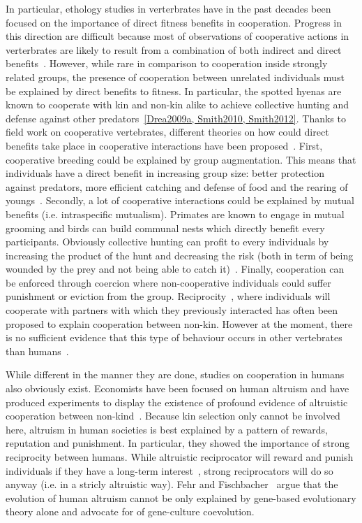     In particular, ethology studies in verterbrates have in the past decades been focused on the importance of direct fitness benefits in cooperation. Progress in this direction are difficult because most of observations of cooperative actions in verterbrates are likely to result from a combination of both indirect and direct benefits~\cite{Clutton-Brock2009}. However, while rare in comparison to cooperation inside strongly related groups, the presence of cooperation between unrelated individuals must be explained by direct benefits to fitness. In particular, the spotted hyenas are known to cooperate with kin and non-kin alike to achieve collective hunting and defense against other predators~\ref{Drea2009a, Smith2010, Smith2012}. Thanks to field work on cooperative vertebrates, different theories on how could direct benefits take place in cooperative interactions have been proposed~\cite{Clutton-Brock2002}. First, cooperative breeding could be explained by group augmentation. This means that individuals have a direct benefit in increasing group size: better protection against predators, more efficient catching and defense of food and the rearing of youngs~\cite{Packer2001}. Secondly, a lot of cooperative interactions could be explained by mutual benefits (i.e. intraspecific mutualism). Primates are known to engage in mutual grooming and birds can build communal nests which directly benefit every participants. Obviously collective hunting can profit to every individuals by increasing the product of the hunt and decreasing the risk (both in term of being wounded by the prey and not being able to catch it)~\cite{Scheel1991}. Finally, cooperation can be enforced through coercion where non-cooperative individuals could suffer punishment or eviction from the group. Reciprocity~\cite{Trivers1971}, where individuals will cooperate with partners with which they previously interacted has often been proposed to explain cooperation between non-kin. However at the moment, there is no sufficient evidence that this type of behaviour occurs in other vertebrates than humans~\cite{Hammerstein2003, Clutton-Brock2009, André2014}.


    While different in the manner they are done, studies on cooperation in humans also obviously exist. Economists have been focused on human altruism and have produced experiments to display the existence of profound evidence of altruistic cooperation between non-kind~\cite{Fehr2002, Fehr2003}. Because kin selection only cannot be involved here, altruism in human societies is best explained by a pattern of rewards, reputation and punishment. In particular, they showed the importance of strong reciprocity between humans. While altruistic reciprocator will reward and punish individuals if they have a long-term interest~\cite{Trivers1971}, strong reciprocators will do so anyway (i.e. in a stricly altruistic way). Fehr and Fischbacher~\cite{Fehr2003} argue that the evolution of human altruism cannot be only explained by gene-based evolutionary theory alone and advocate for of gene-culture coevolution.

